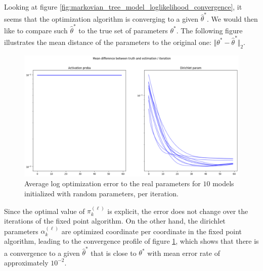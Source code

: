 Looking at figure \ref{fig:markovian_tree_model_loglikelihood_convergence}, it seems that the optimization algorithm is converging to a given $\widehat{\theta}^*$.
We would then like to compare such $\widehat{\theta}^*$ to the true set of parameters $\theta^*$.
The following figure illustrates the mean distance of the parameters to the original one: $\Vert \theta^* - \widehat{\theta}^* \Vert_2$.
\begin{figure}[H]
    \centering
    \includegraphics[scale=0.35]{images/markovian_tree_model_convergence_error_estimators_iteration}
    \caption{Average log optimization error to the real parameters for $10$ models initialized with random parameters, per iteration.}
    \label{fig:markovian_tree_model_error_convergence}
\end{figure}

Since the optimal value of $\pi_k^{(\ell)}$ is explicit, the error does not change over the iterations of the fixed point algorithm.
On the other hand, the dirichlet parameters $\alpha_k^{(\ell)}$ are optimized coordinate per coordinate in the fixed point algorithm,
leading to the convergence profile of figure \ref{fig:markovian_tree_model_error_convergence}, which shows that there is a convergence to
a given $\widehat{\theta}^*$ that is close to $\theta^*$ with mean error rate of approximately $10^{-2}$. \\

